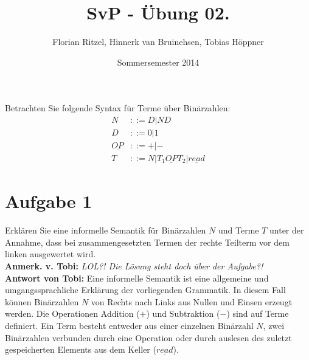 \documentclass[ngerman,a4paper]{report}
\author{Florian Ritzel, Hinnerk van Bruinehsen, Tobias Höppner}
\title{SvP - Übung 02. }
\date{Sommersemester 2014}
\renewcommand{\maketitle}{}
\begin{document}
 
\maketitle 
Betrachten Sie folgende Syntax für Terme über Binärzahlen:
\begin{align*}
N &::= D | ND \\
D &::= 0 | 1 \\
\underline{OP} &::= + | - \\
T &::= N | T_1 \underline{OP}  T_2 | \underline{read}
\end{align*}
\section*{Aufgabe 1}
Erklären Sie eine informelle Semantik für Binärzahlen $N$ und Terme $T$ unter der Annahme, dass bei zusammengesetzten Termen der rechte Teilterm vor dem linken ausgewertet wird.\\
\textbf{Anmerk. v. Tobi:} \emph{LOL?! Die Lösung steht doch über der Aufgabe?!}\\
\textbf{Antwort von Tobi:} Eine informelle Semantik ist eine allgemeine und umgangssprachliche Erklärung der vorliegenden Grammatik. In diesem Fall können Binärzahlen $N$ von Rechts nach Links aus Nullen und Einsen erzeugt werden. Die Operationen Addition ($+$) und Subtraktion ($-$) sind auf Terme definiert. Ein Term besteht entweder aus einer einzelnen Binärzahl $N$, zwei Binärzahlen verbunden durch eine Operation oder durch auslesen des zuletzt gespeicherten Elements aus dem Keller ($\underline{read}$).\\
\end{document}
